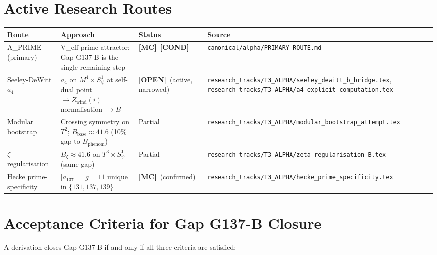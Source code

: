 \documentclass[12pt,a4paper]{article}
\theoremstyle{definition}
\theoremstyle{remark}
\newcommand{\MC}{\textbf{[MC]}}
\newcommand{\COND}{\textbf{[COND]}}
\newcommand{\OPEN}{\textbf{[OPEN]}}
\begin{document}
\section{Active Research Routes}
\label{sec:active}

\begin{center}
\begin{tabular}{p{3.5cm} p{5.5cm} p{2cm} p{2.5cm}}
\toprule
\textbf{Route} & \textbf{Approach} & \textbf{Status} & \textbf{Source} \\
\midrule
A\_PRIME (primary) & V\_eff prime attractor; Gap G137-B is the single
  remaining step & \MC\ \COND &
  \texttt{canonical/alpha/PRIMARY\_ROUTE.md} \\[4pt]
Seeley-DeWitt $a_4$ & $a_4$ on $M^4\times S^1_\psi$ at self-dual point
  $\to Z_{\mathrm{wind}}(i)$ normalisation $\to B$ & \OPEN\ (active, narrowed) &
  \texttt{research\_tracks/T3\_ALPHA/seeley\_dewitt\_b\_bridge.tex},
  \texttt{research\_tracks/T3\_ALPHA/a4\_explicit\_computation.tex} \\[4pt]
Modular bootstrap & Crossing symmetry on $T^2$; $B_{\mathrm{base}}\approx41.6$
  (10\% gap to $B_{\mathrm{phenom}}$) & Partial &
  \texttt{research\_tracks/T3\_ALPHA/modular\_bootstrap\_attempt.tex} \\[4pt]
$\zeta$-regularisation & $B_\zeta\approx41.6$ on $T^3\times S^1_\psi$ (same gap) &
  Partial &
  \texttt{research\_tracks/T3\_ALPHA/zeta\_regularisation\_B.tex} \\[4pt]
Hecke prime-specificity & $|a_{137}|=g=11$ unique in $\{131,137,139\}$ &
  \MC\ (confirmed) &
  \texttt{research\_tracks/T3\_ALPHA/hecke\_prime\_specificity.tex} \\[4pt]
\bottomrule
\end{tabular}
\end{center}

\section{Acceptance Criteria for Gap G137-B Closure}
\label{sec:criteria}

A derivation closes Gap G137-B if and only if all three criteria are satisfied:
\end{document}
